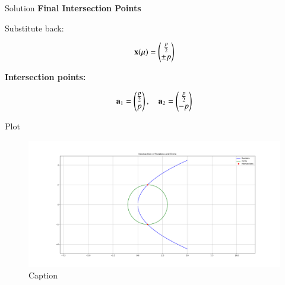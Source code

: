 \documentclass{beamer}
\begin{document}
\begin{frame}{Solution}
\textbf{Final Intersection Points}

Substitute back:

\begin{align}
\mathbf{x}(\mu) = \begin{pmatrix}\frac{p}{2} \\ \pm p\end{pmatrix}
\end{align}

\textbf{Intersection points:}

\begin{align}
\mathbf{a}_1 = \begin{pmatrix}\frac{p}{2} \\ p\end{pmatrix}, \quad
\mathbf{a}_2 = \begin{pmatrix}\frac{p}{2} \\ -p\end{pmatrix}
\end{align}
\end{frame}


\begin{frame}{Plot}
    \begin{figure}
        \centering
        \includegraphics[width=0.8\linewidth]{./figs/Figure_1.png}
        \caption{Caption}
        \label{fig:placeholder}
    \end{figure}
\end{frame}
\end{document}
